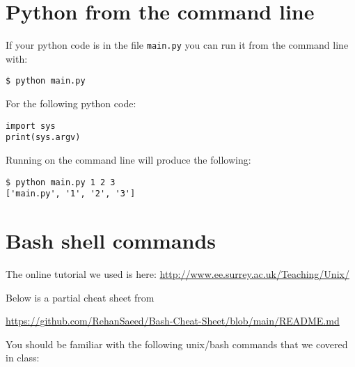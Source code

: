 \documentclass[12pt]{article}
\begin{document}
\section{Python from the command line}

If your python code is in the file {\tt main.py} you can run it from the
command line with:
\begin{Verbatim}[frame=single]
$ python main.py
\end{Verbatim}

For the following python code:
\begin{Verbatim}[frame=single,label=main.py]
import sys
print(sys.argv)
\end{Verbatim}
Running on the command line will produce the following:
\begin{Verbatim}[frame=single]
$ python main.py 1 2 3
['main.py', '1', '2', '3']
\end{Verbatim}



\section{Bash shell commands}

The online tutorial we used is here:
\url{http://www.ee.surrey.ac.uk/Teaching/Unix/}

Below is a partial cheat sheet from

\url{https://github.com/RehanSaeed/Bash-Cheat-Sheet/blob/main/README.md}

You should be familiar with the following unix/bash commands that we covered in class:
\end{document}

